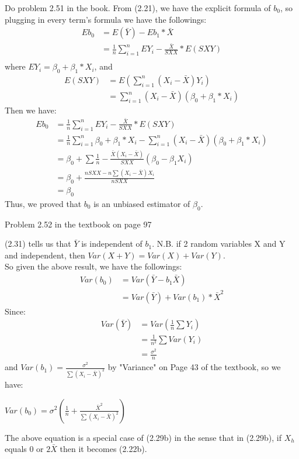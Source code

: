 \documentclass[12pt]{article}
\begin{document}
 { Do problem 2.51 in the book.}
 { \vfill
  \answer
}
{
From (2.21), we have the explicit formula of $b_0$, so plugging in every term's formula we have the followings:\\
\begin{align*}
Eb_0&=E(\bar{Y})-Eb_1*\bar{X}\\
    &=\displaystyle\frac{1}{n}\sum_{i=1}^{n}EY_i-\frac{\bar{X}}{SXX}*E(SXY)\\
\end{align*}
where $EY_i=\beta_0+\beta_1*X_i$, and\\
\begin{align*}
E(SXY)&=E(\displaystyle\sum_{i=1}^{n}(X_i-\bar{X})Y_i)\\
      &=\displaystyle\sum_{i=1}^{n}(X_i-\bar{X})(\beta_0+\beta_1*X_i)
\end{align*}
Then we have:\\
\begin{align*}
Eb_0&=\displaystyle\frac{1}{n}\sum_{i=1}^{n}EY_i-\frac{\bar{X}}{SXX}*E(SXY)\\
    &=\displaystyle\frac{1}{n}\sum_{i=1}^{n}\beta_0+\beta_1*X_i-\displaystyle\sum_{i=1}^{n}(X_i-\bar{X})(\beta_0+\beta_1*X_i)\\
    &=\beta_0+\sum\frac{1}{n}-\frac{\bar{X}(X_i-\bar{X})}{SXX}(\beta_0-\beta_1X_i)\\
    &=\beta_0+\frac{nSXX-n\sum(X_i-\bar{X})X_i}{nSXX}\\
    &=\beta_0
\end{align*}
Thus, we proved that $b_0$ is an unbiased estimator of $\beta_0$.
}

 { Problem 2.52 in the textbook on page 97}
 { \vfill
  \answer
}
{
(2.31) tells us that $\bar{Y}$ is independent of $b_1$. N.B. if 2 random variables X and Y and independent, then $Var(X+Y)=Var(X)+Var(Y)$.\\
So given the above result, we have the followings:\\
\begin{align*}
Var(b_0)&=Var(\bar{Y}-b_1\bar{X})\\
        &=Var(\bar{Y})+Var(b_1)*\bar{X}^2
\end{align*}
Since:\\
\begin{align*}
Var(\bar{Y})&=Var(\frac{1}{n}\sum Y_i)\\
            &=\frac{1}{n^2}\sum Var(Y_i)\\
            &=\frac{\sigma^2}{n}
\end{align*}
and $Var(b_1)=\frac{\sigma^2}{\sum(X_i-\bar{X})^2}$ by "Variance" on Page 43 of the textbook, so we have:\\
\begin{center}
$Var(b_0)=\sigma^2(\frac{1}{n}+\frac{\bar{X}^2}{\sum(X_i-\bar{X})^2})$
\end{center}
The above equation is a special case of (2.29b) in the sense that in (2.29b), if $X_h$ equals 0 or $2\bar{X}$ then it becomes (2.22b).
}



\problemsdone
\end{document}
